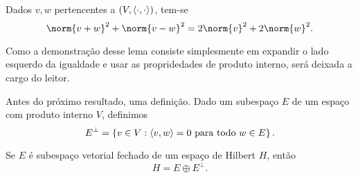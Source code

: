 \begin{lem}
    Dados \( v, w \) pertencentes a \( (V, \langle\cdot,\cdot\rangle) \), tem-se \[
        \norm{ v + w }^2 + \norm{ v - w }^2 = 2 \norm{ v }^2 + 2 \norm{ w }^2
    .\]
\end{lem}

Como a demonstração desse lema consiste simplesmente em expandir o lado esquerdo da igualdade e usar as propridedades de produto interno, será deixada a cargo do leitor.

Antes do próximo resultado, uma definição.
Dado um subespaço \( E \) de um espaço com produto interno \( V \), definimos \[
    E^{ \perp } = \left\{ v \in V : \langle v,w\rangle = 0 \text{ para todo } w \in E \right\}
.\]

\begin{teo}
    \label{teo: proj_ort}
    Se \( E \) é subespaço vetorial fechado de um espaço de Hilbert \( H \), então \[
        H = E \oplus E^{ \perp }
    .\]
\end{teo}
